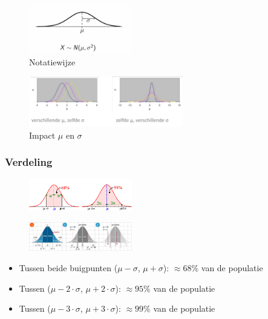 \documentclass{article}
\begin{document}
\begin{figure}[H]
    \centering
    \includegraphics[width=0.4\textwidth]{gauss-notatiewijze.png}
    \caption{Notatiewijze}
\end{figure}

\begin{figure}[H]
    \centering
    \includegraphics[width=0.6\textwidth]{gauss-verschillend.png}
    \caption{Impact $\mu$ en $\sigma$}
\end{figure}

\subsubsection{Verdeling}

\begin{figure}[H]
    \centering
    \includegraphics[width=0.4\textwidth]{gauss-verdeling.png}
\end{figure}

\begin{figure}[H]
    \centering
    \includegraphics[width=0.4\textwidth]{gauss-verdeling2.png}
\end{figure}


\begin{itemize}
    \item Tussen beide buigpunten ($\mu - \sigma$, $\mu + \sigma$): $\approx68\%$ van de populatie
    \item Tussen ($\mu - 2\cdot\sigma$, $\mu + 2\cdot\sigma$): $\approx95\%$ van de populatie
    \item Tussen ($\mu - 3\cdot\sigma$, $\mu + 3\cdot\sigma$): $\approx99\%$ van de populatie
\end{itemize}
\end{document}
